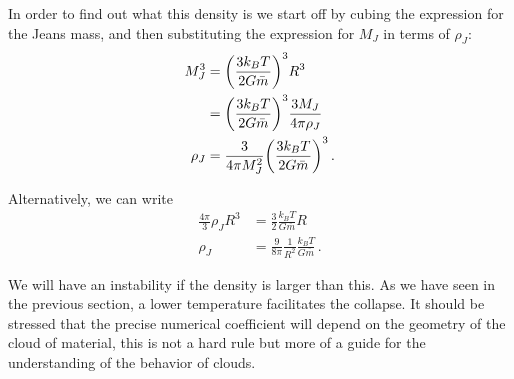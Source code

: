 \documentclass[main.tex]{subfiles}
\begin{document}
In order to find out what this density is we start off by cubing the  
expression for the Jeans mass, and then substituting the expression for \(M_J\) in terms of \(\rho _J\):
%
\begin{align}
M_J^3 &= \qty(\frac{3 k_B T}{2 G \bar{m}})^3 R^3\\
&=  \qty(\frac{3 k_B T}{2 G \bar{m}})^3 \frac{3M_J}{4 \pi \rho _J} \\  
  \rho _J &= \frac{3}{4 \pi M_J^2} \qty(\frac{3 k_B T}{2 G \bar{m}})^3
  \label{eq:jeans-critical-density-by-mass}
\,.
\end{align}

Alternatively, we can write 
%
\begin{align}
\frac{4 \pi }{3} \rho _J R^3 &= \frac{3}{2} \frac{k_B T}{G \overline{m}} R \\
\rho _J &= \frac{9}{8 \pi } \frac{1}{R^2} \frac{k_B T}{G \overline{m}}
\,. \label{eq:jeans-density}
\end{align}
%


We will have an instability if the density is larger than this.
As we have seen in the previous section, a lower temperature facilitates the collapse. 
It should be stressed that the precise numerical coefficient will depend on the geometry of the cloud of material, this is not a hard rule but more of a guide for the understanding of the behavior of clouds.


\end{document}
